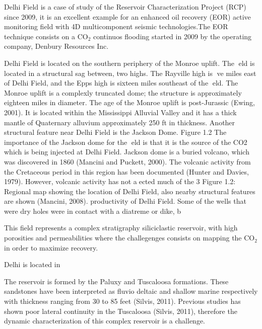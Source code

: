 Delhi Field is a case of study of the Reservoir Characterization Project (RCP)
since 2009, it is an excellent example for an enhanced oil recovery (EOR) 
active monitoring field with 4D multicomponent seismic technologies.The EOR technique 
consists on a CO$_2$ continuos flooding started in 2009 by
the operating company, Denbury Resources Inc. 


Delhi Field is located on the southern periphery of the Monroe uplift. The eld
is located in a structural sag between, two highs. The Rayville high is ve miles
east of Delhi Field, and the Epps high is sixteen miles southeast of the eld. The
Monroe uplift is a complexly truncated dome; the structure is approximately eighteen
miles in diameter. The age of the Monroe uplift is post-Jurassic (Ewing, 2001). It is
located within the Mississippi Alluvial Valley and it has a thick mantle of Quaternary
alluvium approximately 250 ft in thickness. Another structural feature near Delhi
Field is the Jackson Dome. Figure 1.2 The importance of the Jackson dome for the
eld is that it is the source of the CO2 which is being injected at Delhi Field. Jackson
dome is a buried volcano, which was discovered in 1860 (Mancini and Puckett, 2000).
The volcanic activity from the Cretaceous period in this region has been documented
(Hunter and Davies, 1979). However, volcanic activity has not aected much of the
3
Figure 1.2: Regional map showing the location of Delhi Field, also nearby structural
features are shown (Mancini, 2008).
productivity of Delhi Field. Some of the wells that were dry holes were in contact
with a diatreme or dike, b




This field represents a complex
stratigraphy siliciclastic reservoir, with high porosities and permeabilities
where the challegenges consists on mapping the CO$_2$ in order to maximize
recovery.

Delhi is located in 

The reservoir  is formed by the Paluxy and Tuscaloosa formations. These
sandstones have been interpreted as fluvio deltaic and shallow marine 
respectively with thickness ranging from 30 to 85 feet (Silvis, 2011). 
Previous studies has shown poor lateral continuity in the Tuscaloosa (Silvis, 2011),
therefore the dynamic characterization of this complex 
reservoir is a challenge.

